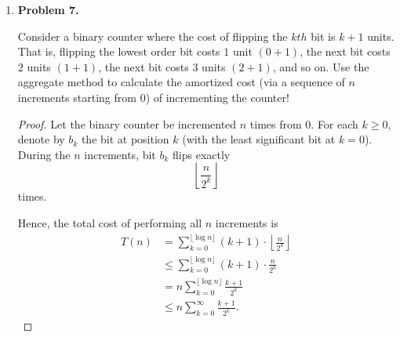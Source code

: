 \documentclass[11pt]{article}
\begin{document}
\begin{enumerate}
\begin{enumerate}
\begin{proof}
Take counterexample to pick

$$
f(n)=1,\qquad s(n)=1,\qquad g(n)=\frac{1}{n^2},\qquad r(n)=\frac{1}{n}.
$$


\begin{itemize}
\item $f\in O(s)$ since $1\le 1\cdot 1$.
\item $g\in O(r)$ because $\tfrac{1}{n^2}\le \tfrac{1}{n}$ for all $n\ge1$.
\item But

\[
\frac{f(n)}{g(n)}=\frac{1}{1/n^2}=n^2,\qquad
\frac{s(n)}{r(n)}=\frac{1}{1/n}=n,
\]

\end{itemize}

and $n^2$ is \textbf{not} $O(n)$. So the claimed relation can fail.


\end{proof}

\end{enumerate}

\item
\textbf{Problem 7.}

Consider a binary counter where the cost of flipping the \(kth\) bit is \(k + 1\) units. That is, flipping the lowest order bit costs \(1\) unit \((0+1)\), the next bit costs \(2\) units \((1+1)\), the next bit costs \(3\) units \((2+1)\), and so on. Use the aggregate method to calculate the amortized cost (via a sequence of \(n\) increments starting from \(0\)) of incrementing the counter!

\begin{proof}

Let the binary counter be incremented \(n\) times from \(0\).  
For each \(k \geq 0\), denote by \(b_k\) the bit at position \(k\) (with the least significant bit at \(k=0\)).  
During the \(n\) increments, bit \(b_k\) flips exactly
\[
\left\lfloor \frac{n}{2^k} \right\rfloor
\]
times.

Hence, the total cost of performing all \(n\) increments is
\[
\begin{aligned}
T(n) &= \sum_{k=0}^{\lfloor \log n \rfloor} (k+1) \cdot \left\lfloor \tfrac{n}{2^k} \right\rfloor \\
&\leq \sum_{k=0}^{\lfloor \log n \rfloor} (k+1) \cdot \frac{n}{2^k} \\
&= n \sum_{k=0}^{\lfloor \log n \rfloor} \frac{k+1}{2^k} \\
&\leq n \sum_{k=0}^{\infty} \frac{k+1}{2^k}.
\end{aligned}
\]


\end{proof}
\end{enumerate}
\end{document}
